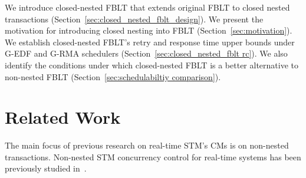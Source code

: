\documentclass[letter]{sig-alternate}
\begin{document}
We introduce closed-nested FBLT that extends original FBLT to closed nested transactions (Section~\ref{sec:closed_nested_fblt_design}). We present the motivation for introducing closed nesting into FBLT (Section~\ref{sec:motivation}). We establish closed-nested FBLT's retry and response time upper bounds under G-EDF and G-RMA schedulers (Section~\ref{sec:closed_nested_fblt rc}). We also identify the conditions under which closed-nested FBLT is a better alternative to non-nested FBLT (Section~\ref{sec:schedulabiltiy comparison}). 
%
\begin{comment}
We implement FBLT and competitor CM techniques in the Rochester STM framework~\cite{marathe2006lowering} and conduct experimental studies (Section~\ref{exp_eval}). Our results reveal that FBLT has shorter retry cost than ECM, RCM, LCM and lock-free. FBLT's retry cost is comparable to that of PNF, especially in case of non-transitive retry, but it doesn't require a-priori knowledge of objects accessed by transactions, unlike PNF. 

Thus, the paper's contribution is the FBLT contention manager with superior timeliness properties. FBLT, thus allows programmers to reap STM's significant programmability and composability benefits for a broader range of multicore embedded real-time software than what was previously possible.
\end{comment}

\section{Related Work}
\label{sec:past}

\begin{comment}
Transactional-like concurrency control without using locks, for real-time systems, has been previously studied in the context of non-blocking data structures (e.g.,~\cite{anderson95realtime}). Despite their numerous advantages over locks 
(e.g., deadlock-freedom), 
their programmability has remained a challenge. 
Past studies show that they are best suited for simple data structures where their retry cost is competitive to the cost of lock-based synchronization~\cite{bc+08}.  In contrast, STM is semantically simpler~\cite{Herlihy:2006:AMP:1146381.1146382}, and is often the only viable lock-free solution for complex data structures (e.g., red/black tree)~\cite{key-1} and nested critical sections~\cite{Saha:2006:MHP:1122971.1123001}.
\end{comment}

The main focus of previous research on real-time STM's CMs is on non-nested transactions. Non-nested STM concurrency control for real-time systems has been previously studied in~\cite{manson2006preemptible,fahmy2009bounding,sarni2009real,schoeberl2010rttm,key-1,barrosmanaging,stmconcurrencycontrol:emsoft11,lcmdac2012,pnf_dac_asp,fblt}.
\end{document}

